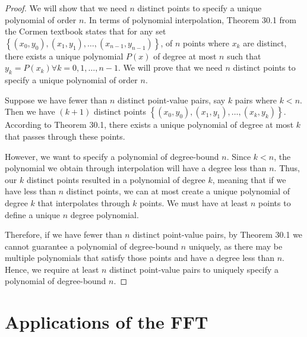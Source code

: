 \documentclass{article}
\renewcommand{\_}{\ifincsname_\else\legacyunderscore\fi}
\begin{document}
\begin{proof}
We will show that we need $n$ distinct points to specify a unique polynomial of order $n$. In terms of polynomial interpolation, Theorem 30.1 from the Cormen textbook states that for any set $\left\{ (x_0, y_0), (x_1, y_1), \hdots,(x_{n-1}, y_{n-1})\right\}$, of $n$ points where $x_k$ are distinct, there exists a unique polynomial $P(x)$ of degree at most $n$ such that $y_k=P(x_k) \forall k=0, 1, \hdots, n-1$. We will prove that we need $n$ distinct points to specify a unique polynomial of order $n$.

Suppose we have fewer than $n$ distinct point-value pairs, say $k$ pairs where $k < n$. Then we have $(k+1)$ distinct points $\left\{(x_0, y_0), (x_1, y_1), \hdots, (x_k, y_k)\right\}$. According to Theorem 30.1, there exists a unique polynomial of degree at most $k$ that passes through these points.

However, we want to specify a polynomial of degree-bound $n$. Since $k < n$, the polynomial we obtain through interpolation will have a degree less than $n$. Thus, our $k$ distinct points resulted in a polynomial of degree $k$, meaning that if we have less than $n$ distinct points, we can at most create a unique polynomial of degree $k$ that interpolates through $k$ points. We must have at least $n$ points to define a unique $n$ degree polynomial.  

Therefore, if we have fewer than $n$ distinct point-value pairs, by Theorem 30.1 we cannot guarantee a polynomial of degree-bound $n$ uniquely, as there may be multiple polynomials that satisfy those points and have a degree less than $n$. Hence, we require at least $n$ distinct point-value pairs to uniquely specify a polynomial of degree-bound $n$.
\end{proof}

    \section*{Applications of the FFT}
\end{document}
